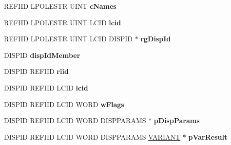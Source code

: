 \begin{DoxyCompactItemize}
\mbox{\label{struct_i_ms_tsc_secured_settings_vtbl_a14a1130465bb4918a0c1e8fe1443ba09}} 
R\+E\+F\+I\+ID L\+P\+O\+L\+E\+S\+TR U\+I\+NT {\bfseries c\+Names}
\item 
\mbox{\label{struct_i_ms_tsc_secured_settings_vtbl_a6aab9fe2feb21defd14debb0db25ba1b}} 
R\+E\+F\+I\+ID L\+P\+O\+L\+E\+S\+TR U\+I\+NT L\+C\+ID {\bfseries lcid}
\item 
\mbox{\label{struct_i_ms_tsc_secured_settings_vtbl_af858024393cdaa25465ad9b61861b594}} 
R\+E\+F\+I\+ID L\+P\+O\+L\+E\+S\+TR U\+I\+NT L\+C\+ID D\+I\+S\+P\+ID $\ast$ {\bfseries rg\+Disp\+Id}
\item 
\mbox{\label{struct_i_ms_tsc_secured_settings_vtbl_aa03bc9a37495937274bde9ac11979c37}} 
D\+I\+S\+P\+ID {\bfseries disp\+Id\+Member}
\item 
\mbox{\label{struct_i_ms_tsc_secured_settings_vtbl_a6fba459dfa843484a46d8056f59dec3e}} 
D\+I\+S\+P\+ID R\+E\+F\+I\+ID {\bfseries riid}
\item 
\mbox{\label{struct_i_ms_tsc_secured_settings_vtbl_a88e6e459134e3692a141c6d058b10fc3}} 
D\+I\+S\+P\+ID R\+E\+F\+I\+ID L\+C\+ID {\bfseries lcid}
\item 
\mbox{\label{struct_i_ms_tsc_secured_settings_vtbl_ababfb103f60cb77d3b98bd877051f141}} 
D\+I\+S\+P\+ID R\+E\+F\+I\+ID L\+C\+ID W\+O\+RD {\bfseries w\+Flags}
\item 
\mbox{\label{struct_i_ms_tsc_secured_settings_vtbl_ad5f44627b3634bbd72d5b9faca227f9a}} 
D\+I\+S\+P\+ID R\+E\+F\+I\+ID L\+C\+ID W\+O\+RD D\+I\+S\+P\+P\+A\+R\+A\+MS $\ast$ {\bfseries p\+Disp\+Params}
\item 
\mbox{\label{struct_i_ms_tsc_secured_settings_vtbl_a9f5633cd526291b2504835dfe6c67a62}} 
D\+I\+S\+P\+ID R\+E\+F\+I\+ID L\+C\+ID W\+O\+RD D\+I\+S\+P\+P\+A\+R\+A\+MS \hyperlink{structtag_v_a_r_i_a_n_t}{V\+A\+R\+I\+A\+NT} $\ast$ {\bfseries p\+Var\+Result}

\end{DoxyCompactItemize}
